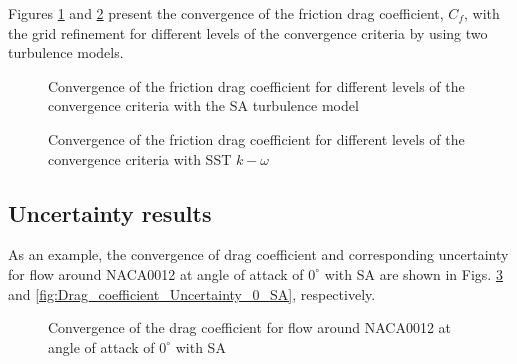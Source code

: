 \documentclass{cfdsc}
\begin{document}
\begin{multicols}{2}
Figures \ref{fig:I_friction_SA} and \ref{fig:I_friction_SSTKW} present the convergence of the friction drag coefficient, $C_f $, with the grid refinement for different levels of the convergence criteria by using two turbulence models.

\begin{figure}[H]
\vspace{-0.4cm}  
\setlength{\abovecaptionskip}{-0.2cm}   
\setlength{\belowcaptionskip}{-0.5cm} 
\caption{Convergence of the friction drag coefficient for different levels of the convergence criteria with the SA turbulence model}
\label{fig:I_friction_SA}
\end{figure}
\begin{figure}[H]
\vspace{-0.4cm}  
\setlength{\abovecaptionskip}{-0.2cm}   
\caption{Convergence of the friction drag coefficient for different levels of the convergence criteria with SST $ k-\omega $}
\label{fig:I_friction_SSTKW}
\end{figure}

\subsection{Uncertainty results}
As an example, the convergence of drag coefficient and corresponding uncertainty for flow around NACA0012 at angle of attack of $ 0^{\circ}$ with SA are shown in Figs. \ref{fig:Drag_coefficient_0_SA} and \ref{fig:Drag_coefficient_Uncertainty_0_SA}, respectively. 

\begin{figure}[H]
\vspace{-0.4cm}  
\setlength{\abovecaptionskip}{-0.2cm}   
\setlength{\belowcaptionskip}{-1cm}  
\caption{Convergence of the drag coefficient for flow around NACA0012 at angle of attack of $ 0^{\circ}$ with SA }
\label{fig:Drag_coefficient_0_SA}
\end{figure}
\begin{figure}[H]
\vspace{-0.4cm}  
\setlength{\abovecaptionskip}{-0.2cm}   
 

\end{figure}
\end{multicols}
\end{document}
